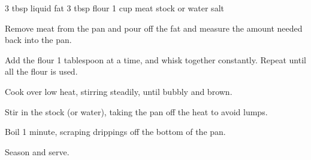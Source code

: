 \dishtype{\sauce}
\begin{ingreds}
    3 tbsp liquid fat
    3 tbsp flour
    1 cup meat stock or water
    salt
\end{ingreds}
\begin{method}
    Remove meat from the pan and pour off the fat and measure the amount needed back into the pan.\par
    Add the flour 1 tablespoon at a time, and whisk together constantly. Repeat until all the flour is used.\par
    Cook over low heat, stirring steadily, until bubbly and brown.\par
    Stir in the stock (or water), taking the pan off the heat to avoid lumps.\par
    Boil 1 minute, scraping drippings off the bottom of the pan.\par
    Season and serve.
\end{method}